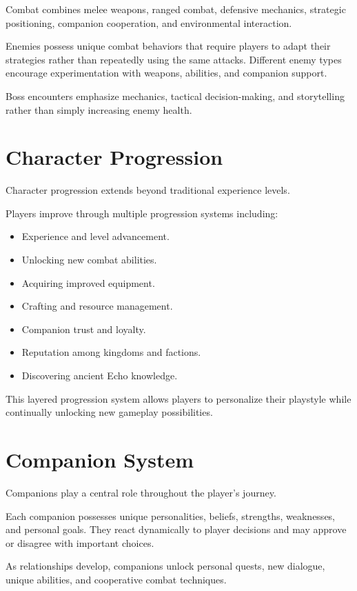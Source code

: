Combat combines melee weapons, ranged combat, defensive mechanics, strategic positioning, companion cooperation, and environmental interaction.

Enemies possess unique combat behaviors that require players to adapt their strategies rather than repeatedly using the same attacks. Different enemy types encourage experimentation with weapons, abilities, and companion support.

Boss encounters emphasize mechanics, tactical decision-making, and storytelling rather than simply increasing enemy health.

\section{Character Progression}

Character progression extends beyond traditional experience levels.

Players improve through multiple progression systems including:

\begin{itemize}
    \item Experience and level advancement.
    \item Unlocking new combat abilities.
    \item Acquiring improved equipment.
    \item Crafting and resource management.
    \item Companion trust and loyalty.
    \item Reputation among kingdoms and factions.
    \item Discovering ancient Echo knowledge.
\end{itemize}

This layered progression system allows players to personalize their playstyle while continually unlocking new gameplay possibilities.

\section{Companion System}

Companions play a central role throughout the player's journey.

Each companion possesses unique personalities, beliefs, strengths, weaknesses, and personal goals. They react dynamically to player decisions and may approve or disagree with important choices.

As relationships develop, companions unlock personal quests, new dialogue, unique abilities, and cooperative combat techniques.


